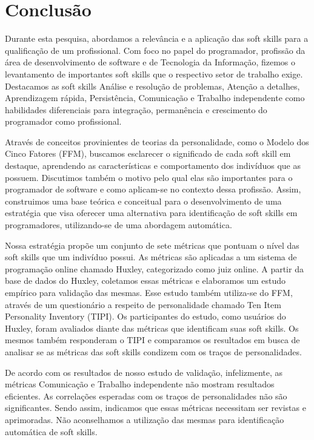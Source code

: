 

\chapter{Conclusão}

\label{chap:conclusion}

Durante esta pesquisa, abordamos a relevância e a aplicação das soft skills para a qualificação de um profissional. Com foco no papel do programador, profissão da área de desenvolvimento de software e de Tecnologia da Informação, fizemos o levantamento de importantes soft skills que o respectivo setor de trabalho exige. Destacamos as soft skills Análise e resolução de problemas, Atenção a detalhes, Aprendizagem rápida, Persistência, Comunicação e Trabalho independente como habilidades diferenciais para integração, permanência e crescimento do programador como profissional.

Através de conceitos provinientes de teorias da personalidade, como o Modelo dos Cinco Fatores (FFM), buscamos esclarecer o significado de cada soft skill em destaque, aprendendo as características e comportamento dos indivíduos que as possuem. Discutimos também o motivo pelo qual elas são importantes para o programador de software e como aplicam-se no contexto dessa profissão. Assim, construimos uma base teórica e conceitual para o desenvolvimento de uma estratégia que visa oferecer uma alternativa para identificação de soft skills em programadores, utilizando-se de uma abordagem automática.

Nossa estratégia propõe um conjunto de sete métricas que pontuam o nível das soft skills que um indivíduo possui. As métricas são aplicadas a um sistema de programação online chamado Huxley, categorizado como juiz online. A partir da base de dados do Huxley, coletamos essas métricas e elaboramos um estudo empírico para validação das mesmas. Esse estudo também utiliza-se do FFM, através de um questionário a respeito de personalidade chamado Ten Item Personality Inventory (TIPI). Os participantes do estudo, como usuários do Huxley, foram avaliados diante das métricas que identificam suas soft skills. Os mesmos também responderam o TIPI e comparamos os resultados em busca de analisar se as métricas das soft skills condizem com os traços de personalidades.

De acordo com os resultados de nosso estudo de validação, infelizmente, as métricas Comunicação e Trabalho independente não mostram resultados eficientes. As correlações esperadas com os traços de personalidades não são significantes. Sendo assim, indicamos que essas métricas necessitam ser revistas e aprimoradas. Não aconselhamos a utilização das mesmas para identificação automática de soft skills.

